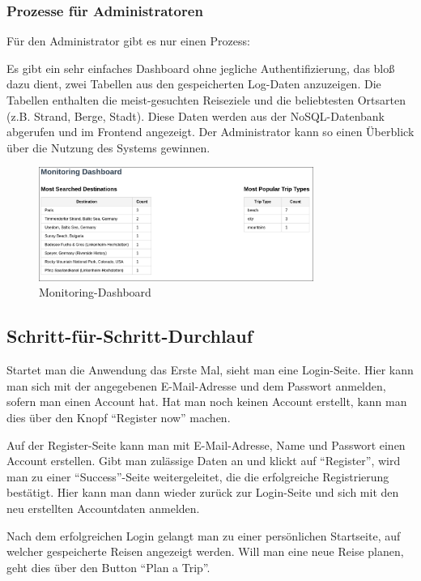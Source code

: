 \subsubsection{Prozesse für Administratoren}

Für den Administrator gibt es nur einen Prozess:

Es gibt ein sehr einfaches Dashboard ohne jegliche Authentifizierung, das bloß dazu dient, zwei Tabellen aus den gespeicherten Log-Daten anzuzeigen. Die Tabellen enthalten die meist-gesuchten Reiseziele und die beliebtesten Ortsarten (z.B. Strand, Berge, Stadt). Diese Daten werden aus der NoSQL-Datenbank abgerufen und im Frontend angezeigt. Der Administrator kann so einen Überblick über die Nutzung des Systems gewinnen.

\begin{figure}[h]
    \centering
    \includegraphics[width=0.8\textwidth]{images/monitoring.png}
    \caption{Monitoring-Dashboard}
\end{figure}

\subsection{Schritt-für-Schritt-Durchlauf}

Startet man die Anwendung das Erste Mal, sieht man eine Login-Seite. Hier kann man sich mit der angegebenen E-Mail-Adresse und dem Passwort anmelden, sofern man einen Account hat. Hat man noch keinen Account erstellt, kann man dies über den Knopf \enquote{Register now} machen.

Auf der Register-Seite kann man mit E-Mail-Adresse, Name und Passwort einen Account erstellen. Gibt man zulässige Daten an und klickt auf \enquote{Register}, wird man zu einer \enquote{Success}-Seite weitergeleitet, die die erfolgreiche Registrierung bestätigt.
Hier kann man dann wieder zurück zur Login-Seite und sich mit den neu erstellten Accountdaten anmelden.

Nach dem erfolgreichen Login gelangt man zu einer persönlichen Startseite, auf welcher gespeicherte Reisen angezeigt werden. Will man eine neue Reise planen, geht dies über den Button \enquote{Plan a Trip}.

